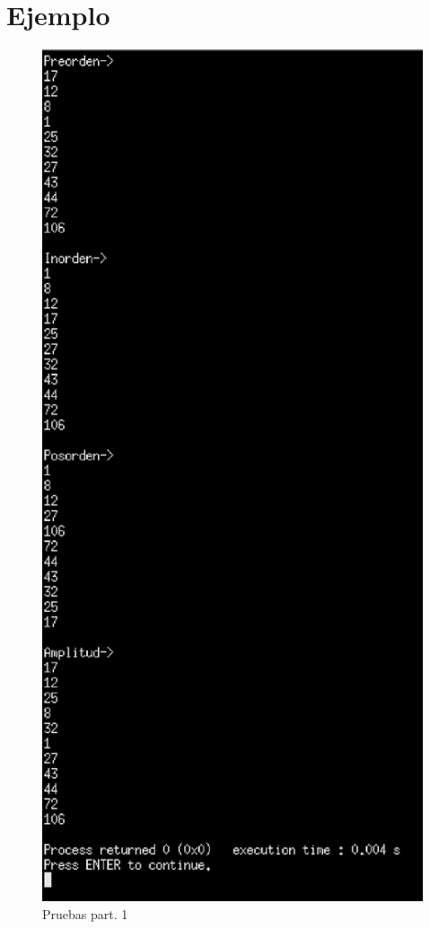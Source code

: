 \documentclass[a4paper,12pt]{article}
\begin{document}
    \section{Ejemplo}
    \begin{figure}[h]
      \centering
      \includegraphics[scale = 0.6]{1.eps}
      \caption{Pruebas part. 1}
    \end{figure}
\end{document}

